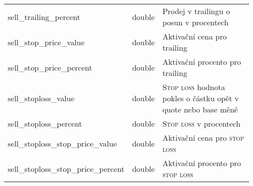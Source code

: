 \begin{center}
\begin{longtable}[h]{|l|C{4cm}|p{4cm}|}
        sell\_trailing\_percent               & double                                                                                                                                                           & Prodej v trailingu o posun v procentech                                                                                           \\
        sell\_stop\_price\_value              & double                                                                                                                                                           & Aktivační cena pro trailing                                                                                                       \\
        sell\_stop\_price\_percent            & double                                                                                                                                                           & Aktivační procento pro trailing                                                                                                   \\
        sell\_stoploss\_value                 & double                                                                                                                                                           & \textsc{Stop loss} hodnota pokles o částku opět v quote nebo base měně                                                            \\
        sell\_stoploss\_percent               & double                                                                                                                                                           & \textsc{Stop loss} v procentech                                                                                                   \\
        sell\_stoploss\_stop\_price\_value    & double                                                                                                                                                           & Aktivační cena pro \textsc{stop loss}                                                                                             \\
        sell\_stoploss\_stop\_price\_percent  & double                                                                                                                                                           & Aktivační procento pro \textsc{stop loss}                                                                                         \\

\end{longtable}
\end{center}
